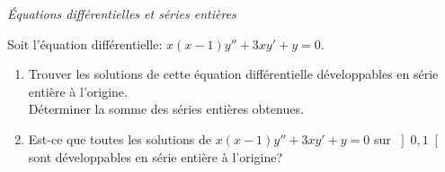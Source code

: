 \documentclass[a4paper,10pt]{report}
\begin{document}
\medskip

\begin{center}
\textit{{ {\large Équations différentielles et séries entières}}}
\end{center}

\medskip

\begin{Exa} Soit l'équation différentielle: $x(x-1)y''+3xy'+y=0$.
\begin{enumerate}
\item Trouver les solutions de cette équation différentielle développables en série entière à l'origine.\\ Déterminer la somme des séries entières obtenues.

\item 
Est-ce que toutes les solutions de $x(x-1)y''+3xy'+y=0$ sur $\left]0,1 \right[$ sont développables en série entière à l'origine? 
\end{enumerate}
\end{Exa}
\end{document}
